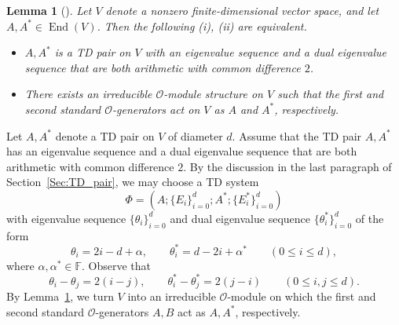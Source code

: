 \documentclass[11pt]{article}%
\theoremstyle{definition}
\theoremstyle{plain}
\newtheorem{lemma}[definition]{Lemma}
\DeclareMathOperator{\End}{End}		%
\begin{document}
\begin{lemma}[{\cite[Theorem~2.4]{2007Har}}]\label{lem:Thm2.4Hartwig}
Let $V$ denote a nonzero finite-dimensional vector space, and let $A,A^* \in \End(V)$.
Then the following {\rm(i)}, {\rm(ii)} are equivalent.
\begin{itemize}
	\item[\rm(i)] $A,A^*$ is a TD pair on $V$ with an eigenvalue sequence and a dual eigenvalue sequence that are both arithmetic with common difference $2$.
	\item[\rm(ii)] There exists an irreducible $\mathcal{O}$-module structure on $V$ such that the first and second standard $\mathcal{O}$-generators act on $V$ as $A$ and $A^*$, respectively.
\end{itemize}
\end{lemma}


Let $A,A^*$ denote a TD pair on $V$ of diameter $d$.
Assume that the TD pair $A, A^*$ has an eigenvalue sequence and a dual eigenvalue sequence that are both arithmetic with common difference $2$.
By the discussion in the last paragraph of Section~\ref{Sec:TD_pair}, we may choose a TD system
$$
    \Phi=(A;\{E_i\}_{i=0}^d;A^*;\{E_i^*\}_{i=0}^d)
$$
with eigenvalue sequence $\{\theta_i\}_{i=0}^d$ and dual eigenvalue sequence $\{\theta_i^*\}_{i=0}^d$ of the form
\begin{equation*}
    \theta_i=2i-d+\alpha,
    \qquad
    \theta_i^*=d-2i+\alpha^*
    \qquad (0\leq i\leq d),
\end{equation*}
where $\alpha,\alpha^*\in\mathbb{F}$.
Observe that
\begin{equation*}
    \theta_i-\theta_j=2(i-j),
    \qquad
    \theta_i^*-\theta_j^*=2(j-i)
    \qquad (0\leq i,j\leq d).
\end{equation*}
By Lemma~\ref{lem:Thm2.4Hartwig}, we turn $V$ into an irreducible $\mathcal{O}$-module on which the first and second standard $\mathcal{O}$-generators $A,B$ act as $A,A^*$, respectively.
\end{document}
